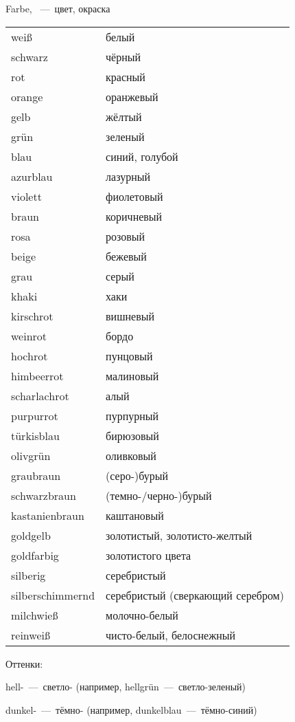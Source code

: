 
 Farbe, ~---~цвет, окраска

\begin{longtable}{|ll|}
\hline
wei\ss & белый \\
schwarz & чёрный \\
rot & красный \\
orange & оранжевый \\
gelb & жёлтый \\
gr\"un & зеленый \\
blau & синий, голубой \\
azurblau & лазурный \\
violett & фиолетовый \\
braun & коричневый \\
rosa & розовый \\
beige & бежевый \\
grau & серый \\
khaki & хаки \\
kirschrot & вишневый \\
weinrot & бордо \\
hochrot & пунцовый \\
himbeerrot & малиновый \\
scharlachrot & алый \\
purpurrot & пурпурный \\
t\"urkisblau & бирюзовый \\
olivgr\"un & оливковый \\
graubraun & (серо-)бурый \\
schwarzbraun & (темно-/черно-)бурый \\
kastanienbraun & каштановый \\
goldgelb & золотистый, золотисто-желтый \\
goldfarbig & золотистого цвета \\
silberig & серебристый \\
silberschimmernd & серебристый (сверкающий серебром) \\
milchwie\ss & молочно-белый \\
reinwei\ss & чисто-белый, белоснежный \\
\hline
\end{longtable}

Оттенки:

hell-~---~светло- (например, hellgr\"un~---~светло-зеленый)

dunkel-~---~тёмно- (например, dunkelblau~---~тёмно-синий)
